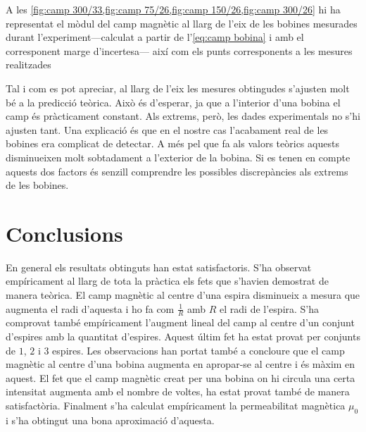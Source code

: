 A les \cref{fig:camp 300/33,fig:camp 75/26,fig:camp 150/26,fig:camp 300/26} hi ha representat el mòdul del camp magnètic al llarg de l'eix de les bobines mesurades durant l'experiment---calculat a partir de l'\cref{eq:camp bobina} i amb el corresponent marge d'incertesa--- així com els punts corresponents a les mesures realitzades

Tal i com es pot apreciar, al llarg de l'eix les mesures obtingudes s'ajusten molt bé a la predicció teòrica. Això és d'esperar, ja que a l'interior d'una bobina el camp és pràcticament constant. Als extrems, però, les dades experimentals no s'hi ajusten tant. Una explicació és que en el nostre cas l'acabament real de les bobines era complicat de detectar. A més pel que fa als valors teòrics aquests disminueixen molt sobtadament a l'exterior de la bobina. Si es tenen en compte aquests dos factors és senzill comprendre les possibles discrepàncies als extrems de les bobines.

\section{Conclusions}
En general els resultats obtinguts han estat satisfactoris. S'ha observat empíricament al llarg de tota la pràctica els fets que s'havien demostrat de manera teòrica. El camp magnètic al centre d'una espira disminueix a mesura que augmenta el radi d'aquesta i ho fa com $\frac{1}{R}$ amb $R$ el radi de l'espira. S'ha comprovat també empíricament l'augment lineal del camp al centre d'un conjunt d'espires amb la quantitat d'espires. Aquest últim fet ha estat provat per conjunts de $1$, $2$ i $3$ espires. Les observacions han portat també a concloure que el camp magnètic al centre d'una bobina augmenta en apropar-se al centre i és màxim en aquest. El fet que el camp magnètic creat per una bobina on hi circula una certa intensitat augmenta amb el nombre de voltes, ha estat provat també de manera satisfactòria. Finalment s'ha calculat empíricament la permeabilitat magnètica $\mu_{0}$ i s'ha obtingut una bona aproximació d'aquesta.




